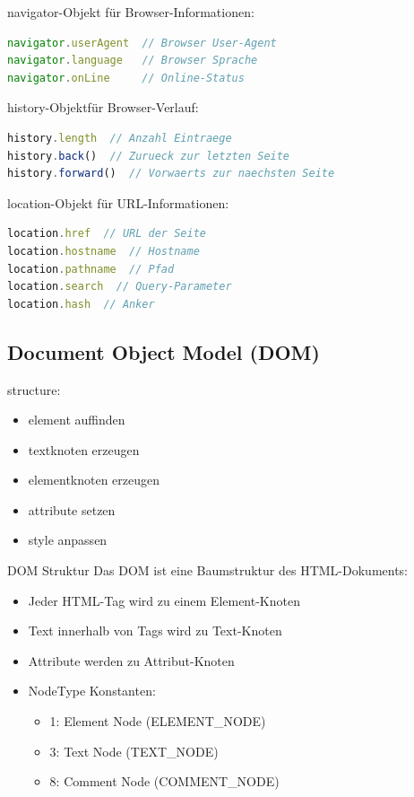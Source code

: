 \begin{KR}{navigator-Objekt} für Browser-Informationen:
\begin{lstlisting}[language=JavaScript, style=basesmol]
navigator.userAgent  // Browser User-Agent
navigator.language   // Browser Sprache
navigator.onLine     // Online-Status
\end{lstlisting}
\end{KR}

\begin{KR}{history-Objekt}für Browser-Verlauf:
\begin{lstlisting}[language=JavaScript, style=basesmol]
history.length  // Anzahl Eintraege
history.back()  // Zurueck zur letzten Seite
history.forward()  // Vorwaerts zur naechsten Seite
\end{lstlisting}
\end{KR}

\begin{KR}{location-Objekt} für URL-Informationen:
\begin{lstlisting}[language=JavaScript, style=basesmol]
location.href  // URL der Seite
location.hostname  // Hostname
location.pathname  // Pfad
location.search  // Query-Parameter
location.hash  // Anker
\end{lstlisting}
\end{KR} 

\subsection{Document Object Model (DOM)}

structure:
\begin{itemize}
    \item element auffinden
    \item textknoten erzeugen
    \item elementknoten erzeugen
    \item attribute setzen
    \item style anpassen
\end{itemize}

\begin{concept}{DOM Struktur}
    Das DOM ist eine Baumstruktur des HTML-Dokuments:
    \begin{itemize}
        \item Jeder HTML-Tag wird zu einem Element-Knoten
        \item Text innerhalb von Tags wird zu Text-Knoten
        \item Attribute werden zu Attribut-Knoten
        \item NodeType Konstanten:
            \begin{itemize}
                \item 1: Element Node (ELEMENT\_NODE)
                \item 3: Text Node (TEXT\_NODE)
                \item 8: Comment Node (COMMENT\_NODE)
            \end{itemize}
    \end{itemize}
\end{concept}

